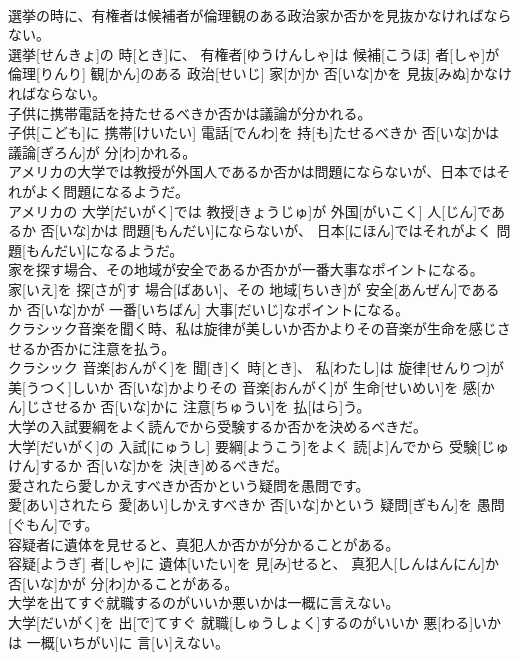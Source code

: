 \documentclass[8pt]{extreport}
\begin{document}
\begin{CJK}{UTF8}{min}
\\	選挙の時に、有権者は候補者が倫理観のある政治家か否かを見抜かなければならない。	
\\	選挙[せんきょ]の 時[とき]に、 有権者[ゆうけんしゃ]は 候補[こうほ] 者[しゃ]が 倫理[りんり] 観[かん]のある 政治[せいじ] 家[か]か 否[いな]かを 見抜[みぬ]かなければならない。
\\	子供に携帯電話を持たせるべきか否かは議論が分かれる。	
\\	子供[こども]に 携帯[けいたい] 電話[でんわ]を 持[も]たせるべきか 否[いな]かは 議論[ぎろん]が 分[わ]かれる。
\\	アメリカの大学では教授が外国人であるか否かは問題にならないが、日本ではそれがよく問題になるようだ。	
\\	アメリカの 大学[だいがく]では 教授[きょうじゅ]が 外国[がいこく] 人[じん]であるか 否[いな]かは 問題[もんだい]にならないが、 日本[にほん]ではそれがよく 問題[もんだい]になるようだ。
\\	家を探す場合、その地域が安全であるか否かが一番大事なポイントになる。	
\\	家[いえ]を 探[さが]す 場合[ばあい]、その 地域[ちいき]が 安全[あんぜん]であるか 否[いな]かが 一番[いちばん] 大事[だいじ]なポイントになる。
\\	クラシック音楽を聞く時、私は旋律が美しいか否かよりその音楽が生命を感じさせるか否かに注意を払う。	
\\	クラシック 音楽[おんがく]を 聞[き]く 時[とき]、 私[わたし]は 旋律[せんりつ]が 美[うつく]しいか 否[いな]かよりその 音楽[おんがく]が 生命[せいめい]を 感[かん]じさせるか 否[いな]かに 注意[ちゅうい]を 払[はら]う。
\\	大学の入試要綱をよく読んでから受験するか否かを決めるべきだ。	
\\	大学[だいがく]の 入試[にゅうし] 要綱[ようこう]をよく 読[よ]んでから 受験[じゅけん]するか 否[いな]かを 決[き]めるべきだ。
\\	愛されたら愛しかえすべきか否かという疑問を愚問です。	
\\	愛[あい]されたら 愛[あい]しかえすべきか 否[いな]かという 疑問[ぎもん]を 愚問[ぐもん]です。
\\	容疑者に遺体を見せると、真犯人か否かが分かることがある。	
\\	容疑[ようぎ] 者[しゃ]に 遺体[いたい]を 見[み]せると、 真犯人[しんはんにん]か 否[いな]かが 分[わ]かることがある。
\\	大学を出てすぐ就職するのがいいか悪いかは一概に言えない。	
\\	大学[だいがく]を 出[で]てすぐ 就職[しゅうしょく]するのがいいか 悪[わる]いかは 一概[いちがい]に 言[い]えない。

\end{CJK}
\end{document}
